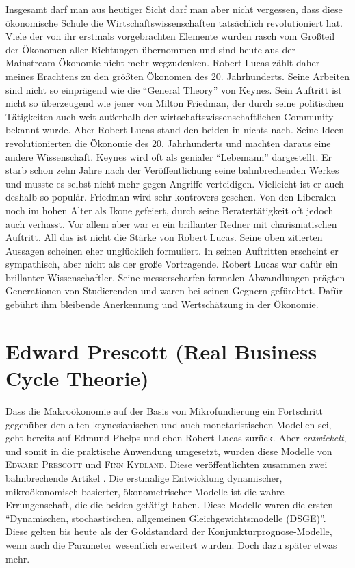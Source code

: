 Insgesamt darf man aus heutiger Sicht darf man aber nicht vergessen, dass diese ökonomische Schule die Wirtschaftswissenschaften tatsächlich revolutioniert hat. Viele der von ihr erstmals vorgebrachten Elemente wurden rasch vom Großteil der Ökonomen aller Richtungen übernommen und sind heute aus der Mainstream-Ökonomie nicht mehr wegzudenken. Robert Lucas zählt daher meines Erachtens zu den größten Ökonomen des 20. Jahrhunderts. Seine Arbeiten sind nicht so einprägend wie die "`General Theory"' von Keynes. Sein Auftritt ist nicht so überzeugend wie jener von Milton Friedman, der durch seine politischen Tätigkeiten auch weit außerhalb der wirtschaftswissenschaftlichen Community bekannt wurde. Aber Robert Lucas stand den beiden in nichts nach. Seine Ideen revolutionierten die Ökonomie des 20. Jahrhunderts und machten daraus eine andere Wissenschaft. Keynes wird oft als genialer "`Lebemann"' dargestellt. Er starb schon zehn Jahre nach der Veröffentlichung seine bahnbrechenden Werkes und musste es selbst nicht mehr gegen Angriffe verteidigen. Vielleicht ist er auch deshalb so populär. Friedman wird sehr kontrovers gesehen. Von den Liberalen noch im hohen Alter als Ikone gefeiert, durch seine Beratertätigkeit oft jedoch auch verhasst. Vor allem aber war er ein brillanter Redner mit charismatischen Auftritt. All das ist nicht die Stärke von Robert Lucas. Seine oben zitierten Aussagen scheinen eher unglücklich formuliert. In seinen Auftritten erscheint er sympathisch, aber nicht als der große Vortragende. Robert Lucas war dafür ein brillanter Wissenschaftler. Seine messerscharfen formalen Abwandlungen prägten Generationen von Studierenden und waren bei seinen Gegnern gefürchtet. Dafür gebührt ihm bleibende Anerkennung und Wertschätzung in der Ökonomie.


\section{Edward Prescott (Real Business Cycle Theorie)}
\label{RBC}
Dass die Makroökonomie auf der Basis von Mikrofundierung ein Fortschritt gegenüber den alten keynesianischen und auch monetaristischen Modellen sei, geht bereits auf Edmund Phelps und eben Robert Lucas zurück. Aber \textit{entwickelt}, und somit in die praktische Anwendung umgesetzt, wurden diese Modelle von \textsc{Edward Prescott} und \textsc{Finn Kydland}. Diese veröffentlichten zusammen zwei bahnbrechende Artikel \parencite{Kydland1977, Kydland1982}. Die erstmalige Entwicklung dynamischer, mikroökonomisch basierter, ökonometrischer Modelle ist die wahre Errungenschaft, die die beiden getätigt haben. Diese Modelle waren die ersten "`Dynamischen, stochastischen, allgemeinen Gleichgewichtsmodelle (DSGE)"'. Diese gelten bis heute als der Goldstandard der Konjunkturprognose-Modelle, wenn auch die Parameter wesentlich erweitert wurden. Doch dazu später etwas mehr.

